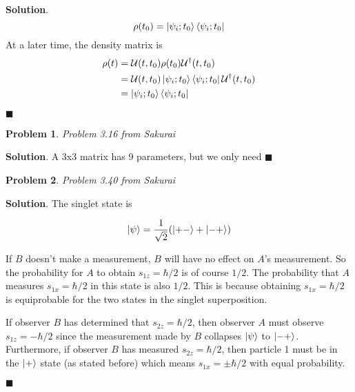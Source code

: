 \documentclass[12pt]{article}
\newtheorem{p}{Problem}
\theoremstyle{definition}
\newenvironment{s}{%
        \begin{trivlist} \item \textbf{Solution}. }{%
            \hspace*{\fill} $\blacksquare$\end{trivlist}}%
\begin{document}
{\begin{s}
\begin{equation*}
\rho(t_{0}) = \ket{\psi_{i};t_{0}}\bra{\psi_{i};t_{0}}
\end{equation*}
At a later time, the density matrix is
\begin{align*}
\rho(t) &= \mathcal{U}(t,t_{0})\rho(t_{0})\mathcal{U}^{\dagger}(t,t_{0})\\
&= \mathcal{U}(t,t_{0})\ket{\psi_{i};t_{0}}\bra{\psi_{i};t_{0}}\mathcal{U}^{\dagger}(t,t_{0})\\
&= \ket{\psi_{i};t_{0}}\bra{\psi_{i};t_{0}}
\end{align*}

\end{s}

\begin{p}
Problem 3.16 from Sakurai
\end{p}

\begin{s}
A 3x3 matrix has 9 parameters, but we only need 
\end{s}

\begin{p}
Problem 3.40 from Sakurai
\end{p}

\begin{s}
The singlet state is 

\begin{align*}
\ket{\psi} = \frac{1}{\sqrt{2}}(\ket{+-} + \ket{-+})
\end{align*}

If $B$ doesn't make a measurement, $B$ will have no effect on $A$'s measurement. So the probability for $A$ to obtain $s_{1z} = \hbar/2$ is of course $1/2$. The probability that $A$ measures $s_{1x} = \hbar/2$ in this state is also $1/2$. This is because obtaining $s_{1x} = \hbar/2$ is equiprobable for the two states in the singlet superposition. 

If observer $B$ has determined that $s_{2z} = \hbar/2$, then observer $A$ must observe $s_{1z} = -\hbar/2$ since the measurement made by $B$ collapses $\ket{\psi}$ to $\ket{-+}$. Furthermore, if observer $B$ has measured $s_{2z} = \hbar/2$, then particle 1 must be in the $\ket{+}$ state (as stated before) which means $s_{1x} = \pm \hbar/2$ with equal probability.

\end{s}
\end{document}
